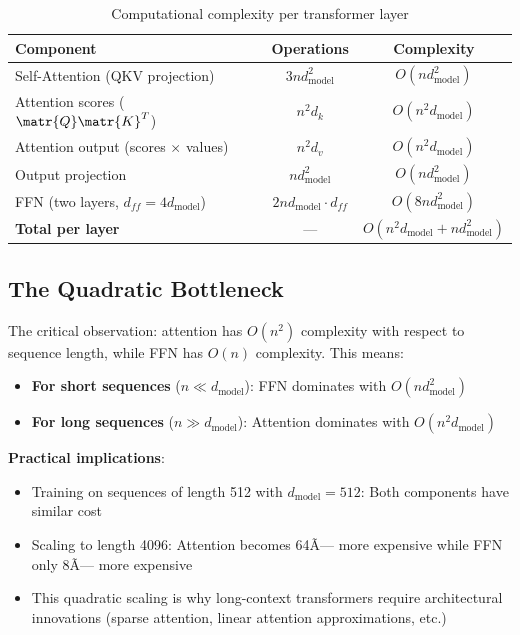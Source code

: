 \begin{table}[h!]
  \centering
  \caption{Computational complexity per transformer layer}
  \begin{tabular}{lcc}
    \toprule
    \textbf{Component} & \textbf{Operations} & \textbf{Complexity} \\
    \midrule
    Self-Attention (QKV projection) & $3nd_{\text{model}}^2$ & $O(nd_{\text{model}}^2)$ \\
    Attention scores ($\matr{Q}\matr{K}^T$) & $n^2d_k$ & $O(n^2d_{\text{model}})$ \\
    Attention output (scores $\times$ values) & $n^2d_v$ & $O(n^2d_{\text{model}})$ \\
    Output projection & $nd_{\text{model}}^2$ & $O(nd_{\text{model}}^2)$ \\
    FFN (two layers, $d_{ff} = 4d_{\text{model}}$) & $2nd_{\text{model}} \cdot d_{ff}$ & $O(8nd_{\text{model}}^2)$ \\
    \midrule
    \textbf{Total per layer} & --- & $O(n^2d_{\text{model}} + nd_{\text{model}}^2)$ \\
    \bottomrule
  \end{tabular}
\end{table}

\subsection{The Quadratic Bottleneck}

The critical observation: attention has $O(n^2)$ complexity with respect to sequence length, while FFN has $O(n)$ complexity. This means:

\begin{itemize}
  \item \textbf{For short sequences} ($n \ll d_{\text{model}}$): FFN dominates with $O(nd_{\text{model}}^2)$
  \item \textbf{For long sequences} ($n \gg d_{\text{model}}$): Attention dominates with $O(n^2d_{\text{model}})$
\end{itemize}

\textbf{Practical implications}:
\begin{itemize}
  \item Training on sequences of length 512 with $d_{\text{model}}=512$: Both components have similar cost
  \item Scaling to length 4096: Attention becomes 64Ã— more expensive while FFN only 8Ã— more expensive
  \item This quadratic scaling is why long-context transformers require architectural innovations (sparse attention, linear attention approximations, etc.)
\end{itemize}

